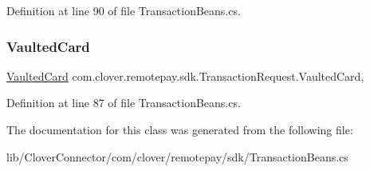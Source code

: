 Definition at line 90 of file Transaction\+Beans.\+cs.

\mbox{\label{classcom_1_1clover_1_1remotepay_1_1sdk_1_1_transaction_request_ae2d37e0e485e6f21143863a4fe64fdf3}} 
\subsubsection{\texorpdfstring{Vaulted\+Card}{VaultedCard}}
{\footnotesize\ttfamily \hyperlink{classcom_1_1clover_1_1sdk_1_1v3_1_1payments_1_1_vaulted_card}{Vaulted\+Card} com.\+clover.\+remotepay.\+sdk.\+Transaction\+Request.\+Vaulted\+Card\hspace{0.3cm}{\ttfamily [get]}, {\ttfamily [set]}}



Definition at line 87 of file Transaction\+Beans.\+cs.



The documentation for this class was generated from the following file\+:\begin{DoxyCompactItemize}
\item 
lib/\+Clover\+Connector/com/clover/remotepay/sdk/Transaction\+Beans.\+cs\end{DoxyCompactItemize}
